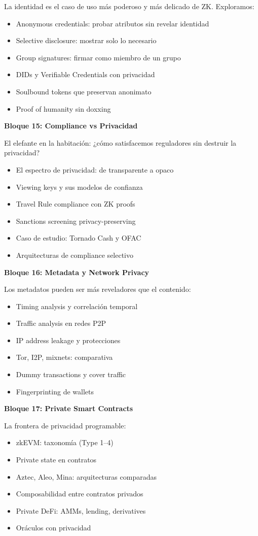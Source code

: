 \documentclass[11pt,a4paper,twoside]{book}
\theoremstyle{definition}
\theoremstyle{remark}
\begin{document}
La identidad es el caso de uso más poderoso y más delicado de ZK. Exploramos:
\begin{itemize}
    \item Anonymous credentials: probar atributos sin revelar identidad
    \item Selective disclosure: mostrar solo lo necesario
    \item Group signatures: firmar como miembro de un grupo
    \item DIDs y Verifiable Credentials con privacidad
    \item Soulbound tokens que preservan anonimato
    \item Proof of humanity sin doxxing
\end{itemize}

\textbf{Bloque 15: Compliance vs Privacidad}

El elefante en la habitación: ¿cómo satisfacemos reguladores sin destruir la privacidad?
\begin{itemize}
    \item El espectro de privacidad: de transparente a opaco
    \item Viewing keys y sus modelos de confianza
    \item Travel Rule compliance con ZK proofs
    \item Sanctions screening privacy-preserving
    \item Caso de estudio: Tornado Cash y OFAC
    \item Arquitecturas de compliance selectivo
\end{itemize}

\textbf{Bloque 16: Metadata y Network Privacy}

Los metadatos pueden ser más reveladores que el contenido:
\begin{itemize}
    \item Timing analysis y correlación temporal
    \item Traffic analysis en redes P2P
    \item IP address leakage y protecciones
    \item Tor, I2P, mixnets: comparativa
    \item Dummy transactions y cover traffic
    \item Fingerprinting de wallets
\end{itemize}

\textbf{Bloque 17: Private Smart Contracts}

La frontera de privacidad programable:
\begin{itemize}
    \item zkEVM: taxonomía (Type 1--4)
    \item Private state en contratos
    \item Aztec, Aleo, Mina: arquitecturas comparadas
    \item Composabilidad entre contratos privados
    \item Private DeFi: AMMs, lending, derivatives
    \item Oráculos con privacidad
\end{itemize}
\end{document}
